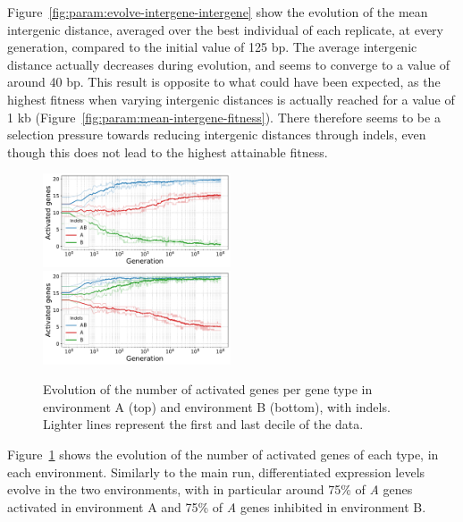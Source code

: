 Figure~\ref{fig:param:evolve-intergene-intergene} show the evolution of the mean intergenic distance, averaged over the best individual of each replicate, at every generation, compared to the initial value of 125 bp.
The average intergenic distance actually decreases during evolution, and seems to converge to a value of around 40 bp.
This result is opposite to what could have been expected, as the highest fitness when varying intergenic distances is actually reached for a value of 1 kb (Figure~\ref{fig:param:mean-intergene-fitness}).
There therefore seems to be a selection pressure towards reducing intergenic distances through indels, even though this does not lead to the highest attainable fitness.

\begin{figure}[H]
\centering
\includegraphics[width=0.495\textwidth]{param/evolve-intergene/gene_activity_env_A.pdf}
\includegraphics[width=0.495\textwidth]{param/evolve-intergene/gene_activity_env_B.pdf}
\caption[Evolution of the number of activated genes in each environment, with indels]{Evolution of the number of activated genes per gene type in environment A (top) and environment B (bottom), with indels.
Lighter lines represent the first and last decile of the data.}
\label{fig:param:evolve-intergene-activ-by-env}
\end{figure}

Figure~\ref{fig:param:evolve-intergene-activ-by-env} shows the evolution of the number of activated genes of each type, in each environment.
Similarly to the main run, differentiated expression levels evolve in the two environments, with in particular around 75\% of \emph{A} genes activated in environment A and 75\% of \emph{A} genes inhibited in environment B.

